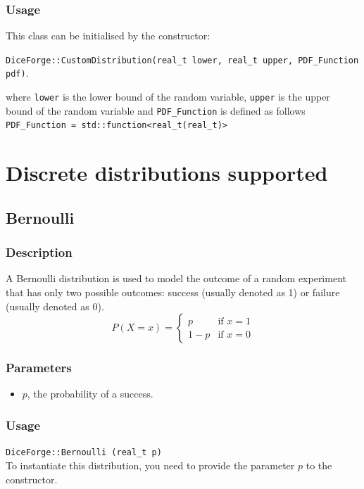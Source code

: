\documentclass[titlepage, 11pt]{article}
\newcommand{\code}[1]
{\colorbox{light-gray}{\texttt{#1}}}
\begin{document}
\subsubsection{Usage}
This class can be initialised by the constructor:
\begin{center}
\code {DiceForge::CustomDistribution(real\_t lower, real\_t upper, PDF\_Function pdf)}.\\    
\end{center}
where \code{lower} is the lower bound of the random variable, \code{upper} is the upper bound of the random variable and \code{PDF\_Function} is defined as follows \\
\code{PDF\_Function = std::function<real\_t(real\_t)>}









\pagebreak
\section{Discrete distributions supported}

\subsection{Bernoulli}
\subsubsection{Description}
A Bernoulli distribution is used to model the outcome of a random experiment that has only two possible outcomes: success (usually denoted as 1) or failure (usually denoted as 0).
\newline
\begin{equation}
P(X = x) = \begin{cases} 
p & \text{if } x = 1 \\
1 - p & \text{if } x = 0 
\end{cases}
\end{equation}

\subsubsection{Parameters}
\begin{itemize}
    \item $p$, the probability of a success.
\end{itemize}

\subsubsection{Usage}
\code{DiceForge::Bernoulli (real\_t p)}\\
To instantiate this distribution, you need to provide the parameter $p$ to the constructor.
 
\end{document}
